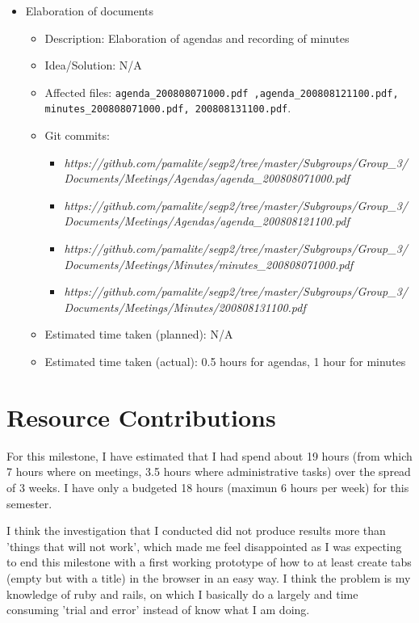 \begin{itemize}
\begin{itemize}
	     \end{itemize}
	\item Elaboration of documents
	     \begin{itemize}
	         \item Description: Elaboration of agendas and recording of minutes 
	         \item Idea/Solution: N/A
	         \item Affected files: \texttt{agenda_200808071000.pdf ,agenda_200808121100.pdf, minutes_200808071000.pdf, 200808131100.pdf}.  
	         \item Git commits: \begin{itemize}
	                             \item \textit{https://github.com/pamalite/segp2/tree/master/Subgroups/Group_3/Documents/Meetings/Agendas/agenda_200808071000.pdf}
				     \item \textit{https://github.com/pamalite/segp2/tree/master/Subgroups/Group_3/Documents/Meetings/Agendas/agenda_200808121100.pdf}
				     \item \textit{https://github.com/pamalite/segp2/tree/master/Subgroups/Group_3/Documents/Meetings/Minutes/minutes_200808071000.pdf}
				     \item \textit{https://github.com/pamalite/segp2/tree/master/Subgroups/Group_3/Documents/Meetings/Minutes/200808131100.pdf} 
	                            \end{itemize}
		 \item Estimated time taken (planned): N/A
	         \item Estimated time taken (actual): 0.5 hours for agendas, 1 hour for minutes
	     \end{itemize}
\end{itemize}

\section*{Resource Contributions}

For this milestone, I have estimated that I had spend about 19 hours (from which 7 hours where on meetings, 3.5 hours where administrative tasks) over the spread of 3 weeks. I have only a budgeted 18 hours (maximun 6 hours per week) for this semester. 

I think the investigation that I conducted did not produce results more than 'things that will not work', which made me feel disappointed as I was expecting to end this milestone with a first working prototype of how to at least create tabs (empty but with a title) in the browser in an easy way.  I think the problem is my knowledge of ruby and rails, on which I basically do a largely and time consuming 'trial and error' instead of know what I am doing.

